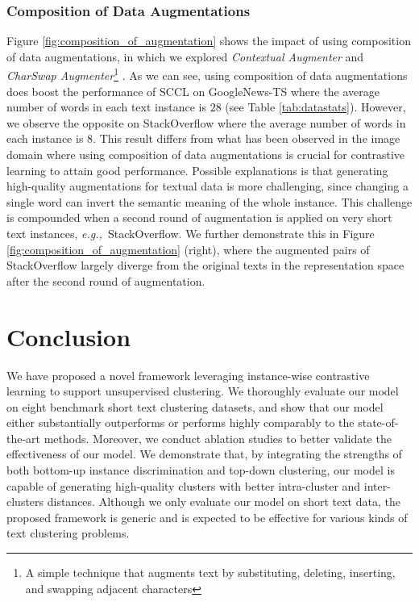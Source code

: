 \documentclass[11pt]{article}
\def\eg{{\em e.g.,~}}
\begin{document}
\subsubsection{Composition of Data Augmentations}
\label{subsec:comp_dataaug}
Figure \ref{fig:composition_of_augmentation} shows the impact of using composition of data augmentations, in which we explored \textit{Contextual Augmenter} and \textit{CharSwap Augmenter}\footnote{A simple technique that augments text by substituting, deleting, inserting, and swapping adjacent characters} \citep{morris2020textattack}.  As we can see, using composition of data augmentations does boost the performance of SCCL on GoogleNews-TS where the average number of words in each text instance is $28$ (see Table \ref{tab:datastats}).
However, we observe the opposite on StackOverflow where the average number of words in each instance is 8. This result differs from what has been observed in the image domain where using composition of data augmentations is crucial for contrastive learning to attain good performance. Possible explanations is that generating high-quality augmentations for textual data is more challenging, since changing a single word can invert the semantic meaning of the whole instance. This challenge is compounded when a second round of augmentation is applied on very short text instances, \eg StackOverflow. We further demonstrate this in Figure \ref{fig:composition_of_augmentation} (right), where the augmented pairs of StackOverflow largely diverge from the original texts in the representation space after the second round of augmentation.  

\section{Conclusion}
We have proposed a novel framework leveraging instance-wise contrastive learning to support unsupervised clustering. We thoroughly evaluate our model on eight benchmark short text clustering datasets, and show that our model either  substantially outperforms or performs highly comparably to the state-of-the-art methods. Moreover, we conduct ablation studies to better validate the effectiveness of our model. We demonstrate that, by integrating the strengths of both bottom-up instance discrimination and  top-down clustering, our model is capable of generating high-quality clusters with better intra-cluster and inter-clusters distances. Although we only evaluate our model on short text data, the proposed framework is generic and is expected to be effective for various kinds of text clustering problems. 
\end{document}
